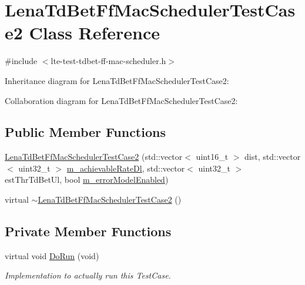 \hypertarget{classLenaTdBetFfMacSchedulerTestCase2}{}\section{Lena\+Td\+Bet\+Ff\+Mac\+Scheduler\+Test\+Case2 Class Reference}
\label{classLenaTdBetFfMacSchedulerTestCase2}


{\ttfamily \#include $<$lte-\/test-\/tdbet-\/ff-\/mac-\/scheduler.\+h$>$}



Inheritance diagram for Lena\+Td\+Bet\+Ff\+Mac\+Scheduler\+Test\+Case2\+:


Collaboration diagram for Lena\+Td\+Bet\+Ff\+Mac\+Scheduler\+Test\+Case2\+:
\subsection*{Public Member Functions}
\begin{DoxyCompactItemize}
\item 
\hyperlink{classLenaTdBetFfMacSchedulerTestCase2_aad3a022779b8af8cfeb7f661a9548582}{Lena\+Td\+Bet\+Ff\+Mac\+Scheduler\+Test\+Case2} (std\+::vector$<$ uint16\+\_\+t $>$ dist, std\+::vector$<$ uint32\+\_\+t $>$ \hyperlink{classLenaTdBetFfMacSchedulerTestCase2_af342b9db780045b97bfe39fef96fea60}{m\+\_\+achievable\+Rate\+Dl}, std\+::vector$<$ uint32\+\_\+t $>$ est\+Thr\+Td\+Bet\+Ul, bool \hyperlink{classLenaTdBetFfMacSchedulerTestCase2_aedf7576a6b04173f851c1d3c074fc292}{m\+\_\+error\+Model\+Enabled})
\item 
virtual \hyperlink{classLenaTdBetFfMacSchedulerTestCase2_ac6a599b2e501b9a11448521eb045ea55}{$\sim$\+Lena\+Td\+Bet\+Ff\+Mac\+Scheduler\+Test\+Case2} ()
\end{DoxyCompactItemize}
\subsection*{Private Member Functions}
\begin{DoxyCompactItemize}
\item 
virtual void \hyperlink{classLenaTdBetFfMacSchedulerTestCase2_a57f91550eee3286bec279c76f9ab8a19}{Do\+Run} (void)
\begin{DoxyCompactList}\small\item\em Implementation to actually run this Test\+Case. \end{DoxyCompactList}\end{DoxyCompactItemize}

